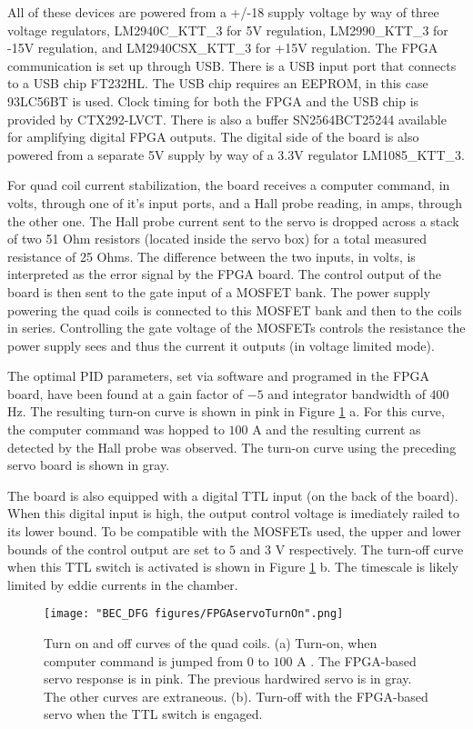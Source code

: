 All of these devices are powered from a +/-18 supply voltage by way of three voltage regulators, LM2940C\_KTT\_3 for 5V regulation, LM2990\_KTT\_3 for -15V regulation, and LM2940CSX\_KTT\_3 for +15V regulation. The FPGA communication is set up through USB. There is a USB input port that connects to a USB chip FT232HL. The USB chip requires an EEPROM, in this case 93LC56BT is used. Clock timing for both the FPGA and the USB chip is provided by  CTX292-LVCT. There is also a buffer SN2564BCT25244 available for amplifying digital FPGA outputs. The digital side of the board is also powered from a separate 5V supply by way of a 3.3V regulator LM1085\_KTT\_3.

For quad coil current stabilization, the board receives a computer command, in volts, through one of it's input ports, and a Hall probe reading, in amps, through the other one.  The Hall probe current sent to the servo is dropped across a stack of two 51 Ohm resistors (located inside the servo box) for a total measured resistance of 25 Ohms. The difference between the two inputs, in volts, is interpreted as the error signal by the FPGA board. The control output of the board is then sent to the gate input of a MOSFET bank. The power supply powering the quad coils is connected to this MOSFET bank and then to the coils in series. Controlling the gate voltage of the MOSFETs controls the resistance the power supply sees and thus the current it outputs (in voltage limited mode).  

The optimal PID parameters, set via software and programed in the FPGA board, have been found at a gain factor of $-5$ and integrator bandwidth of $400$ Hz. The resulting turn-on curve is shown in pink in Figure \ref{fig:FPGAservoTurnOn} a. For this curve, the computer command was hopped to $100$ A and the resulting current as detected by the Hall probe was observed. The turn-on curve using the preceding servo board is shown in gray. 

The board is also equipped with a digital TTL input (on the back of the board). When this digital input is high, the output control voltage is imediately railed to its lower bound. To be compatible with the MOSFETs used, the upper and lower bounds of the control output are set to $5$ and $3$ V respectively. The turn-off curve when this TTL switch is activated is shown in  Figure \ref{fig:FPGAservoTurnOn} b. The timescale is likely limited by eddie currents in the chamber. 

\begin{figure}
	\texttt{[image: "BEC\_DFG figures/FPGAservoTurnOn".png]}
\caption[Turn on and off curves of the quad coils]{Turn on and off curves of the quad coils. (a) Turn-on, when computer command is jumped from $0$ to $100$ A . The FPGA-based servo response is in pink. The previous hardwired servo is in gray. The other curves are extraneous. (b). Turn-off with the FPGA-based servo when the TTL switch is engaged.}
\label{fig:FPGAservoTurnOn}
\end{figure}

